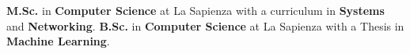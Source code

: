 

\begin{scholarship}
  {\textbf{M.Sc.} in \textbf{Computer Science} at La Sapienza with a curriculum in \textbf{Systems} and \textbf{Networking}. }
  \emptySeparator
  {\textbf{B.Sc.} in \textbf{Computer Science} at La Sapienza with a Thesis in \textbf{Machine Learning}. \newline  {}}

\end{scholarship}

